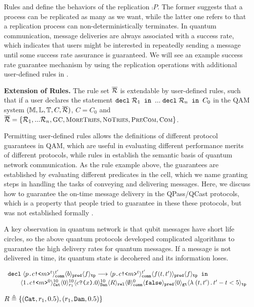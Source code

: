 Rules  and  define the behaviors of the replication $\comp{P}$.
The former suggests that a process can be replicated as many as we want, while the latter one refers to that a replication process can non-deterministically terminates.
In quantum communication, message deliveries are always associated with a success rate,
which indicates that users might be interested in repeatedly sending a message until some success rate assurance is guaranteed.
We will see an example success rate guarantee mechanism by using the replication operations with additional user-defined rules in .

\noindent\textbf{Extension of Rules.}
The rule set $\overline{\mathcal{R}}$ is extendable by user-defined rules, 
such that if a user declares the statement $\texttt{decl}\;\mathcal{R}_1\texttt{ in }...\; \texttt{decl}\;\mathcal{R}_n\texttt{ in }C_0$
in the QAM system $(\mathbb{M},\mathbb{L},\mathbb{T},C,\overline{\mathcal{R}})$, $C=C_0$ and $\overline{\mathcal{R}}=\{\mathcal{R}_1,...\mathcal{R}_n,{\small \textsc{GC}},{\small \textsc{MoreTries}},{\small \textsc{NoTries}}, {\small \textsc{PreCom}},{\small \textsc{Com}}\}$.

Permitting user-defined rules allows the definitions of different protocol guarantees in QAM,
which are useful in evaluating different performance merits of different protocols,
while rules in  establish the semantic basis of quantum network communication.
As the  rule example above, the guarantees are established by evaluating different predicates in the  cell,
which we name granting steps in handling the tasks of conveying and delivering messages.
Here, we discuss how to guarantee the on-time message delivery in the QPass/QCast protocols,
which is a property that people tried to guarantee in these these protocols, but was not established formally \cite{10.1145/3387514.3405853}.

A key observation in quantum network is that qubit messages have short life circles,
so the above quantum protocols developed complicated algorithms to guarantee the high delivery rates for quantum messages.
If a message is not delivered in time, its quantum state is decohered and its information loses.

{\footnotesize
\[
\begin{array}{l}
\texttt{decl}\;\langle p\texttt{.}c\texttt{!<}m\texttt{>}^t \rangle^{t'}_{\texttt{comm}}\langle b \rangle_{\texttt{pred}}\langle f \rangle_{\texttt{tp}} 
     \longrightarrow \langle p\texttt{.}c\texttt{!<}m\texttt{>}^t \rangle^{t'}_{\texttt{comm}}\langle f(t,t') \rangle_{\texttt{pred}}\langle f \rangle_{\texttt{tp}}\texttt{ in }
\\[0.2em]
\qquad
\langle 1\texttt{.}c\texttt{!<}m\texttt{>}^0 \rangle^{10}_{\texttt{Cat}}\langle 0 \rangle^{10}_{r_1}
\langle c\texttt{?(}x\texttt{)}.0 \rangle^{10}_{\texttt{Dan}} 
\langle R \rangle_{\texttt{rel}}
\langle \emptyset \rangle^{0}_{\texttt{comm}}
\langle \texttt{false} \rangle_{\texttt{pred}}
\langle 0 \rangle_{\texttt{gt}}
\langle \lambda\;(t,t')\,.\,t'-t<5 \rangle_{\texttt{tp}}
\end{array}
\]
}
{\footnotesize
\begin{center}
$R\triangleq\{(\texttt{Cat},r_1,0.5), (r_1,\texttt{Dan},0.5)\}$
\end{center}
}


